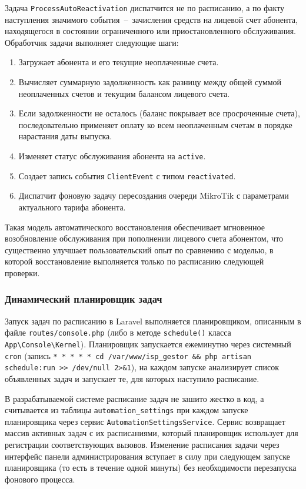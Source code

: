 Задача \texttt{ProcessAutoReactivation} диспатчится не по расписанию, а по факту наступления значимого события~--~зачисления средств на лицевой счет абонента, находящегося в состоянии ограниченного или приостановленного обслуживания. Обработчик задачи выполняет следующие шаги:
\begin{enumerate}
\item Загружает абонента и его текущие неоплаченные счета.
\item Вычисляет суммарную задолженность как разницу между общей суммой неоплаченных счетов и текущим балансом лицевого счета.
\item Если задолженности не осталось (баланс покрывает все просроченные счета), последовательно применяет оплату ко всем неоплаченным счетам в порядке нарастания даты выпуска.
\item Изменяет статус обслуживания абонента на \texttt{active}.
\item Создает запись события \texttt{ClientEvent} с типом \texttt{reactivated}.
\item Диспатчит фоновую задачу пересоздания очереди MikroTik с параметрами актуального тарифа абонента.
\end{enumerate}

Такая модель автоматического восстановления обеспечивает мгновенное возобновление обслуживания при пополнении лицевого счета абонентом, что существенно улучшает пользовательский опыт по сравнению с моделью, в которой восстановление выполняется только по расписанию следующей проверки.

\subsubsection{Динамический планировщик задач}

Запуск задач по расписанию в Laravel выполняется планировщиком, описанным в файле \texttt{routes/console.php} (либо в методе \texttt{schedule()} класса \texttt{App\textbackslash Console\textbackslash Kernel}). Планировщик запускается ежеминутно через системный \texttt{cron} (запись \texttt{* * * * * cd /var/www/isp\_gestor \&\& php artisan schedule:run >> /dev/null 2>\&1}), на каждом запуске анализирует список объявленных задач и запускает те, для которых наступило расписание.

В разрабатываемой системе расписание задач не зашито жестко в код, а считывается из таблицы \texttt{automation\_settings} при каждом запуске планировщика через сервис \texttt{AutomationSettingsService}. Сервис возвращает массив активных задач с их расписаниями, который планировщик использует для регистрации соответствующих вызовов. Изменение расписания задачи через интерфейс панели администрирования вступает в силу при следующем запуске планировщика (то есть в течение одной минуты) без необходимости перезапуска фонового процесса.

